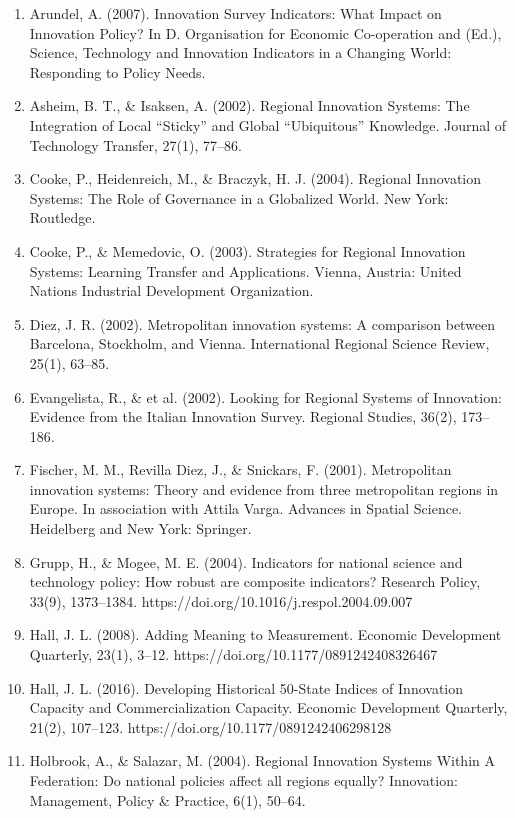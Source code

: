 \documentclass[a4paper,11pt]{article}
\begin{document}
\begin{enumerate}
\item Arundel, A. (2007). Innovation Survey Indicators: What Impact on Innovation Policy? In D. Organisation for Economic Co-operation and (Ed.), Science, Technology and Innovation Indicators in a Changing World: Responding to Policy Needs.
\item Asheim, B. T., \& Isaksen, A. (2002). Regional Innovation Systems: The Integration of Local “Sticky” and Global “Ubiquitous” Knowledge. Journal of Technology Transfer, 27(1), 77–86.
\item Cooke, P., Heidenreich, M., \& Braczyk, H. J. (2004). Regional Innovation Systems: The Role of Governance in a Globalized World. New York: Routledge.
\item Cooke, P., \& Memedovic, O. (2003). Strategies for Regional Innovation Systems: Learning Transfer and Applications. Vienna, Austria: United Nations Industrial Development Organization.
\item Diez, J. R. (2002). Metropolitan innovation systems: A comparison between Barcelona, Stockholm, and Vienna. International Regional Science Review, 25(1), 63–85.
\item Evangelista, R., \& et al. (2002). Looking for Regional Systems of Innovation: Evidence from the Italian Innovation Survey. Regional Studies, 36(2), 173–186.
\item Fischer, M. M., Revilla Diez, J., \& Snickars, F. (2001). Metropolitan innovation systems: Theory and evidence from three metropolitan regions in Europe. In association with Attila Varga. Advances in Spatial Science. Heidelberg and New York: Springer.
\item Grupp, H., \& Mogee, M. E. (2004). Indicators for national science and technology policy: How robust are composite indicators? Research Policy, 33(9), 1373–1384. https://doi.org/10.1016/j.respol.2004.09.007
\item Hall, J. L. (2008). Adding Meaning to Measurement. Economic Development Quarterly, 23(1), 3–12. https://doi.org/10.1177/0891242408326467
\item Hall, J. L. (2016). Developing Historical 50-State Indices of Innovation Capacity and Commercialization Capacity. Economic Development Quarterly, 21(2), 107–123. https://doi.org/10.1177/0891242406298128
\item Holbrook, A., \& Salazar, M. (2004). Regional Innovation Systems Within A Federation: Do national policies affect all regions equally? Innovation: Management, Policy \& Practice, 6(1), 50–64.

\end{enumerate}
\end{document}
